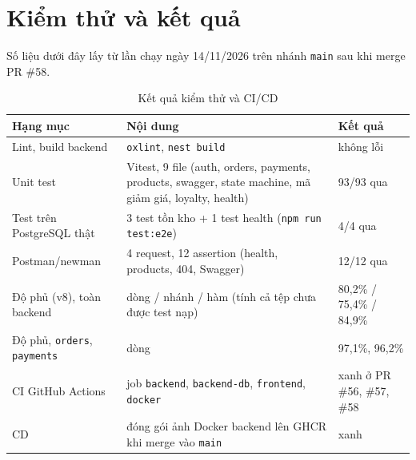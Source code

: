 \documentclass[12pt, a4paper]{article}
\begin{document}
\section{Kiểm thử và kết quả}
Số liệu dưới đây lấy từ lần chạy ngày 14/11/2026 trên nhánh \texttt{main} sau khi merge PR \#58.

\begin{table}[!htbp]\centering\small
\begin{tabularx}{\textwidth}{@{}l X l@{}}
\toprule \textbf{Hạng mục} & \textbf{Nội dung} & \textbf{Kết quả} \\ \midrule
Lint, build backend & \texttt{oxlint}, \texttt{nest build} & không lỗi \\
Unit test & Vitest, 9 file (auth, orders, payments, products, swagger, state machine, mã giảm giá, loyalty, health) & 93/93 qua \\
Test trên PostgreSQL thật & 3 test tồn kho + 1 test health (\texttt{npm run test:e2e}) & 4/4 qua \\
Postman/newman & 4 request, 12 assertion (health, products, 404, Swagger) & 12/12 qua \\
Độ phủ (v8), toàn backend & dòng / nhánh / hàm (tính cả tệp chưa được test nạp) & 80,2\% / 75,4\% / 84,9\% \\
Độ phủ, \texttt{orders}, \texttt{payments} & dòng & 97,1\%, 96,2\% \\
CI GitHub Actions & job \texttt{backend}, \texttt{backend-db}, \texttt{frontend}, \texttt{docker} & xanh ở PR \#56, \#57, \#58 \\
CD & đóng gói ảnh Docker backend lên GHCR khi merge vào \texttt{main} & xanh \\ \bottomrule
\end{tabularx}
\caption{Kết quả kiểm thử và CI/CD}
\end{table}
\end{document}
